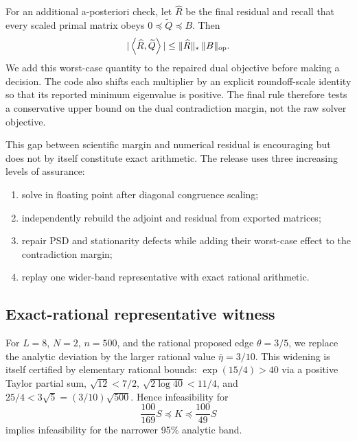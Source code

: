 \documentclass[11pt]{article}
\newcommand{\ip}[2]{\left\langle #1,#2\right\rangle}
\begin{document}
For an additional a-posteriori check, let $\widehat R$ be the final residual and
recall that every scaled primal matrix obeys $0\preceq\widetilde Q\preceq B$.
Then
\begin{equation}
  |\ip{\widehat R}{\widetilde Q}|
  \le \|\widehat R\|_*\,\|B\|_{\rm op}.
  \label{eq:residualbound}
\end{equation}
We add this worst-case quantity to the repaired dual objective before making a
decision.  The code also shifts each multiplier by an explicit roundoff-scale
identity so that its reported minimum eigenvalue is positive.  The final rule
therefore tests a conservative upper bound on the dual contradiction margin,
not the raw solver objective.

This gap between scientific margin and numerical residual is encouraging but
does not by itself constitute exact arithmetic.  The release uses three
increasing levels of assurance:
\begin{enumerate}
 \item solve in floating point after diagonal congruence scaling;
 \item independently rebuild the adjoint and residual from exported matrices;
 \item repair PSD and stationarity defects while adding their worst-case effect
 to the contradiction margin;
 \item replay one wider-band representative with exact rational arithmetic.
\end{enumerate}

\subsection{Exact-rational representative witness}
\label{sec:rational}

For $L=8$, $N=2$, $n=500$, and the rational proposed edge
$\theta=3/5$, we replace the analytic deviation by the larger rational value
$\bar\eta=3/10$.  This widening is itself certified by elementary rational
bounds: $\exp(15/4)>40$ via a positive Taylor partial sum,
$\sqrt{12}<7/2$, $\sqrt{2\log40}<11/4$, and
$25/4<3\sqrt5=(3/10)\sqrt{500}$.  Hence infeasibility for
\begin{equation}
 \frac{100}{169}S\preceq K\preceq\frac{100}{49}S
 \label{eq:rationalband}
\end{equation}
implies infeasibility for the narrower 95\% analytic band.
\end{document}
